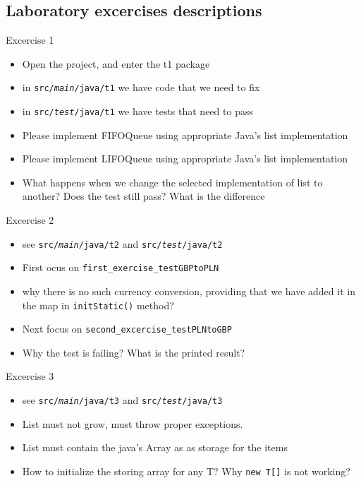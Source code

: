 \documentclass{beamer}
\begin{document}
\subsection{Laboratory excercises descriptions}


\begin{frame}{Excercise 1}

\begin{itemize}
	\item Open the project, and enter the t1 package
    \item in \texttt{src/\textit{main}/java/t1} we have code that we need to fix
    \item in \texttt{src/\textit{test}/java/t1} we have tests that need to pass
    \item Please implement FIFOQueue using appropriate Java's list implementation
    \item Please implement LIFOQueue using appropriate Java's list implementation
    \item What happens when we change the selected implementation of list to another? Does the test still pass? What is the difference
\end{itemize}
\end{frame}

\begin{frame}{Excercise 2}

\begin{itemize}
    \item see \texttt{src/\textit{main}/java/t2} and \texttt{src/\textit{test}/java/t2}
    \item First ocus on \texttt{first\_exercise\_testGBPtoPLN}
    \item why there is no such currency conversion, providing that we have added it in the map in \texttt{initStatic()} method?
    \item Next focus on \texttt{second\_excercise\_testPLNtoGBP}
    \item Why the test is failing? What is the printed result?
\end{itemize}
\end{frame}

\begin{frame}{Excercise 3}

\begin{itemize}
    \item see \texttt{src/\textit{main}/java/t3} and \texttt{src/\textit{test}/java/t3}
    \item List must not grow, must throw proper exceptions.
    \item List must contain the java's Array as as storage for the items
    \item How to initialize the storing array for any T? Why \texttt{new T[]} is not working?
\end{itemize}
\end{frame}
\end{document}
